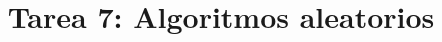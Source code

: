 \documentclass{doc}
\title{Tarea 7: Algoritmos aleatorios}
\begin{document}
\makedocheader

\end{document}
